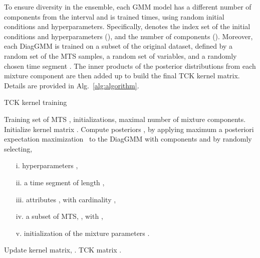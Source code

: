 \documentclass[a4paper,10pt,pdftex]{article}
\begin{document}
To ensure diversity in the ensemble, each GMM model has a different number of components from the interval  and is trained  times, using random initial conditions and hyperparameters.
Specifically,  denotes the index set of the initial conditions and hyperparameters (), and the number of components ().
Moreover, each DiagGMM is trained on a subset of the original dataset, defined by a random set of the MTS samples, a random set  of  variables, and a randomly chosen time segment . 
The inner products of the posterior distributions from each mixture component are then added up to build the final TCK kernel matrix.
Details are provided in Alg.~\ref{alg:algorithm}.


\begin{algorithm}[t!]
\small
\caption{TCK kernel training}
\label{alg:algorithm}
\begin{algorithmic}[1]
\Require Training set of MTS  ,  initializations,  maximal number of mixture components.
\State Initialize kernel matrix .
\For{}
\State Compute posteriors , by applying maximum a posteriori expectation maximization~\cite{mikalsen2017time} to the DiagGMM with  components and by randomly selecting,
\begin{itemize}
\item[i.] hyperparameters ,
\item[ii.] a time segment  of length {\footnotesize  },
\item[iii.] attributes , with cardinality {\footnotesize},
\item[iv.] a subset of MTS, , with {\footnotesize},
\item[v.] initialization of the mixture parameters .
\end{itemize}
\State Update kernel matrix, .
\EndFor
\Ensure TCK matrix .
\end{algorithmic}
\end{algorithm}





\end{document}
